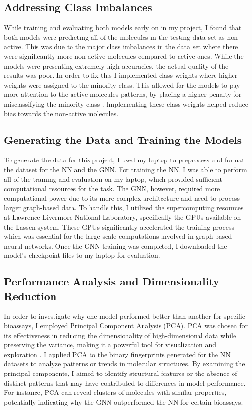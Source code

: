 \documentclass[10pt,twocolumn]{article}
\begin{document}
\subsection{Addressing Class Imbalances}

While training and evaluating both models early on in my project, I found that both models were predicting all of the molecules in the testing data set as non-active. This was due to the major class imbalances in the data set where there were significantly more non-active molecules compared to active ones. While the models were presenting extremely high accuracies, the actual quality of the results was poor. In order to fix this I implemented class weights where higher weights were assigned to the minority class. This allowed for the models to pay more attention to the active molecules patterns, by placing a higher penalty for misclassifying the minority class \textcite{weights}. Implementing these class weights helped reduce bias towards the non-active molecules.  

\subsection{Generating the Data and Training the Models}

To generate the data for this project, I used my laptop to preprocess and format the dataset for the NN and the GNN. For training the NN, I was able to perform all of the training and evaluation on my laptop, which provided sufficient computational resources for the task. The GNN, however, required more computational power due to its more complex architecture and need to process larger graph-based data. To handle this, I utilized the supercomputing resources at Lawrence Livermore National Laboratory, specifically the GPUs available on the Lassen system. These GPUs significantly accelerated the training process which was essential for the large-scale computations involved in graph-based neural networks. Once the GNN training was completed, I downloaded the model’s checkpoint files to my laptop for evaluation. 

\subsection{Performance Analysis and Dimensionality Reduction}
In order to investigate why one model performed better than another for specific bioassays, I employed Principal Component Analysis (PCA). PCA was chosen for its effectiveness in reducing the dimensionality of high-dimensional data while preserving the variance, making it a powerful tool for visualization and exploration \textcite{PCA}. I applied PCA to the binary fingerprints generated for the NN datasets to analyze patterns or trends in molecular structures. By examining the principal components, I aimed to identify structural features or the absence of distinct patterns that may have contributed to differences in model performance. For instance, PCA can reveal clusters of molecules with similar properties, potentially indicating why the GNN outperformed the NN for certain bioassays.
\end{document}
